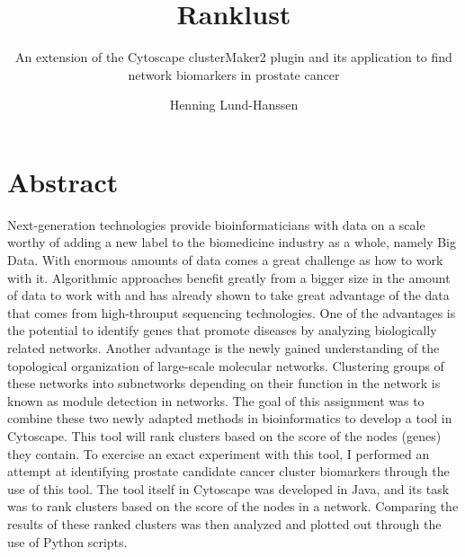 \documentclass[a4paper,UKenglish]{ifimaster}
\title{Ranklust}
\subtitle{An extension of the Cytoscape clusterMaker2 plugin and its application
to find network biomarkers in prostate cancer}
\author{Henning Lund-Hanssen}
\begin{document}
\duoforside[program={Programming and Networks},
    dept={Department of Informatics},long]

\frontmatter{}
\printglossaries

\setlength{\parskip}{12pt}
\setlength{\parindent}{12pt}

\chapter*{Abstract}
Next-generation technologies provide bioinformaticians with data on a scale
worthy of adding a new label to the biomedicine industry as a whole, namely
Big Data. With enormous amounts of data comes a great challenge as how to work
with it. Algorithmic approaches benefit greatly from a bigger size in the amount
of data to work with and has already shown to take great advantage of the data
that comes from high-throuput sequencing technologies. One of the advantages is
the potential to identify genes that promote diseases by analyzing biologically
related networks. Another advantage is the newly gained understanding of the
topological organization of large-scale molecular networks. Clustering groups
of these networks into subnetworks depending on their function in the network is
known as module detection in networks. The goal of this assignment was to
combine these two newly adapted methods in bioinformatics to develop a tool in
Cytoscape. This tool will rank clusters based on the score of the nodes (genes)
they contain. To exercise an exact experiment with this tool, I performed an
attempt at identifying prostate candidate cancer cluster biomarkers through the
use of this tool. The tool itself in Cytoscape was developed in Java, and its
task was to rank clusters based on the score of the nodes in a network.
Comparing the results of these ranked clusters was then analyzed and plotted out
through the use of Python scripts.


\tableofcontents{}
\listoffigures{}
\listoftables{}
\lstlistoflistings

\mainmatter{}





\backmatter{}
\printbibliography
\end{document}
